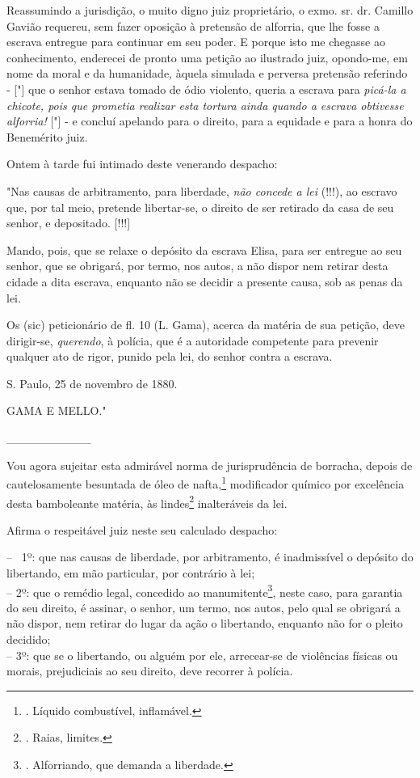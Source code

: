 Reassumindo a jurisdição, o muito digno juiz proprietário, o exmo. sr.
dr. Camillo Gavião requereu, sem fazer oposição à pretensão de alforria,
que lhe fosse a escrava entregue para continuar em seu poder. E porque
isto me chegasse ao conhecimento, enderecei de pronto uma petição ao
ilustrado juiz, opondo-me, em nome da moral e da humanidade, àquela
simulada e perversa pretensão referindo - {[}"{]} que o senhor estava
tomado de ódio violento, queria a escrava para \emph{picá-la a chicote,
pois que prometia realizar esta tortura ainda quando a escrava obtivesse
alforria!} {[}"{]} - e concluí apelando para o direito, para a equidade
e para a honra do Benemérito juiz.

Ontem à tarde fui intimado deste venerando despacho:

"Nas causas de arbitramento, para liberdade, \emph{não concede a lei}
(!!!), ao escravo que, por tal meio, pretende libertar-se, o direito de
ser retirado da casa de seu senhor, e depositado. {[}!!!{]}

Mando, pois, que se relaxe o depósito da escrava Elisa, para ser
entregue ao seu senhor, que se obrigará, por termo, nos autos, a não
dispor nem retirar desta cidade a dita escrava, enquanto não se decidir
a presente causa, sob as penas da lei.

Os (sic) peticionário de fl. 10 (L. Gama), acerca da matéria de sua
petição, deve dirigir-se, \emph{querendo}, à polícia, que é a autoridade
competente para prevenir qualquer ato de rigor, punido pela lei, do
senhor contra a escrava.

S. Paulo, 25 de novembro de 1880.

GAMA E MELLO."

\_\_\_\_\_\_\_\_\_\_

Vou agora sujeitar esta admirável norma de jurisprudência de borracha,
depois de cautelosamente besuntada de óleo de nafta,\footnote{. Líquido
  combustível, inflamável.} modificador químico por excelência desta
bamboleante matéria, às lindes\footnote{. Raias, limites.} inalteráveis
da lei.

Afirma o respeitável juiz neste seu calculado despacho:

-- ~1º: que nas causas de liberdade, por arbitramento, é inadmissível o
depósito do libertando, em mão particular, por contrário à lei;\\
-- 2º: que o remédio legal, concedido ao manumitente\footnote{.
  Alforriando, que demanda a liberdade.}, neste caso, para garantia do
seu direito, é assinar, o senhor, um termo, nos autos, pelo qual se
obrigará a não dispor, nem retirar do lugar da ação o libertando,
enquanto não for o pleito decidido;\\
-- 3º: que se o libertando, ou alguém por ele, arrecear-se de violências
físicas ou morais, prejudiciais ao seu direito, deve recorrer à polícia.

